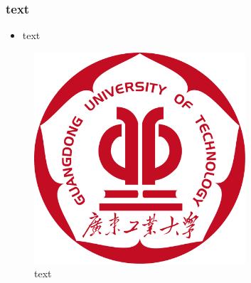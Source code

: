 \subsubsection{text}
\begin{itemize}
    \item text
\end{itemize}
\begin{figure}[h]
    \centering
    \includegraphics[width=0.7\textwidth]{figures/logo.pdf}
    \caption{text}
\end{figure}




